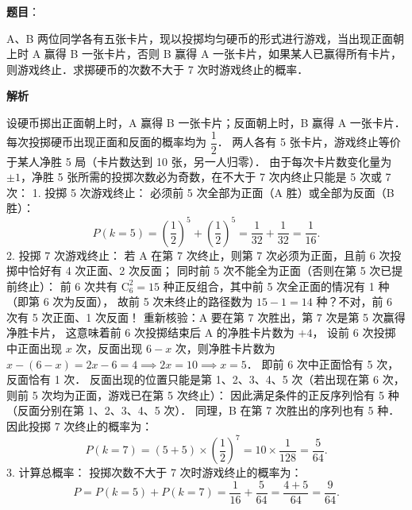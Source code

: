 \begin{answer}

\end{answer}
\begin{answer}

\textbf{题目}：

A、B 两位同学各有五张卡片，现以投掷均匀硬币的形式进行游戏，当出现正面朝上时 A 赢得 B 一张卡片，否则 B 赢得 A 一张卡片，如果某人已赢得所有卡片，则游戏终止．求掷硬币的次数不大于 7 次时游戏终止的概率．

\textbf{解析}

设硬币掷出正面朝上时，A 赢得 B 一张卡片；反面朝上时，B 赢得 A 一张卡片．
每次投掷硬币出现正面和反面的概率均为 $\dfrac{1}{2}$．
两人各有 5 张卡片，游戏终止等价于某人净胜 5 局（卡片数达到 10 张，另一人归零）．
由于每次卡片数变化量为 $\pm 1$，净胜 5 张所需的投掷次数必为奇数，在不大于 7 次内终止只能是 5 次或 7 次：
1. 投掷 5 次游戏终止：
必须前 5 次全部为正面（A 胜）或全部为反面（B 胜）：
\nopagebreak[4]
\[
P(k = 5) = \left(\dfrac{1}{2}\right)^5 + \left(\dfrac{1}{2}\right)^5 = \dfrac{1}{32} + \dfrac{1}{32} = \dfrac{1}{16}.
\]
2. 投掷 7 次游戏终止：
若 A 在第 7 次终止，则第 7 次必须为正面，且前 6 次投掷中恰好有 4 次正面、2 次反面；
同时前 5 次不能全为正面（否则在第 5 次已提前终止）：
前 6 次共有 $\mathrm{C}_6^2 = 15$ 种正反组合，其中前 5 次全正面的情况有 1 种（即第 6 次为反面），
故前 5 次未终止的路径数为 $15 - 1 = 14$ 种？不对，前 6 次有 5 次正面、1 次反面！
重新核验：A 要在第 7 次胜出，第 7 次是第 5 次赢得净胜卡片，
这意味着前 6 次投掷结束后 A 的净胜卡片数为 $+4$，
设前 6 次投掷中正面出现 $x$ 次，反面出现 $6-x$ 次，则净胜卡片数为 $x - (6 - x) = 2x - 6 = 4 \implies 2x = 10 \implies x = 5$．
即前 6 次中正面恰有 5 次，反面恰有 1 次．
反面出现的位置只能是第 1、2、3、4、5 次（若出现在第 6 次，则前 5 次均为正面，游戏已在第 5 次终止）：
因此满足条件的正反序列恰有 5 种（反面分别在第 1、2、3、4、5 次）．
同理，B 在第 7 次胜出的序列也有 5 种．
因此投掷 7 次终止的概率为：
\nopagebreak[4]
\[
P(k = 7) = (5 + 5) \times \left(\dfrac{1}{2}\right)^7 = 10 \times \dfrac{1}{128} = \dfrac{5}{64}.
\]
3. 计算总概率：
投掷次数不大于 7 次时游戏终止的概率为：
\nopagebreak[4]
\[
P = P(k = 5) + P(k = 7) = \dfrac{1}{16} + \dfrac{5}{64} = \dfrac{4 + 5}{64} = \dfrac{9}{64}.
\]


\end{answer}
